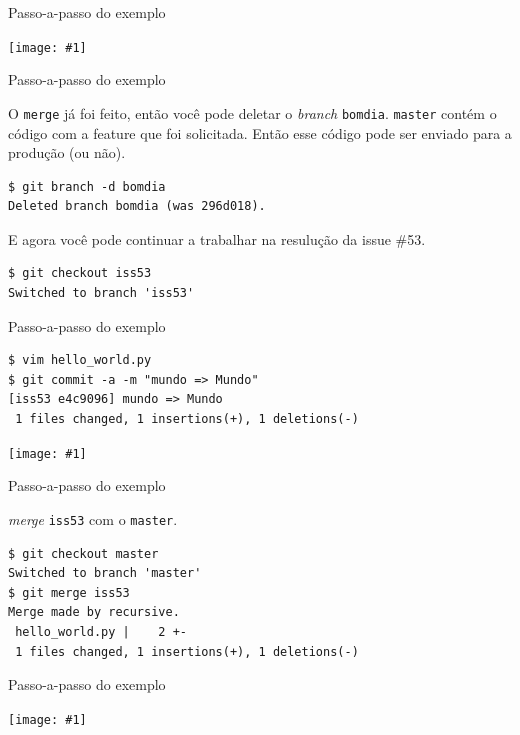 \documentclass[portuguese,brazil]{beamer}
\newcommand\img[1]{
  \begin{center}
    \texttt{[image: \#1]}
  \end{center}
}
\begin{document}
\begin{frame}[fragile]{Passo-a-passo do exemplo}
  \img{images/mergebomdia.png}
\end{frame}

\begin{frame}[fragile]{Passo-a-passo do exemplo}
\begin{center}
O \texttt{merge} já foi feito, então você pode deletar o \textit{branch}
\texttt{bomdia}. \texttt{master} contém o código com a feature que foi
solicitada. Então esse código pode ser enviado para a produção (ou não).
\end{center}
\pause
\begin{verbatim}
$ git branch -d bomdia
Deleted branch bomdia (was 296d018).
\end{verbatim}
\pause
\begin{center}
E agora você pode continuar a trabalhar na resulução da issue \#53.
\end{center}
\pause
\begin{verbatim}
$ git checkout iss53
Switched to branch 'iss53'
\end{verbatim}
\end{frame}

\begin{frame}[fragile]{Passo-a-passo do exemplo}
\pause
\begin{verbatim}
$ vim hello_world.py
$ git commit -a -m "mundo => Mundo"
[iss53 e4c9096] mundo => Mundo
 1 files changed, 1 insertions(+), 1 deletions(-)
\end{verbatim}
\pause
\img{images/secondcommitiss53.png}
\end{frame}

\begin{frame}[fragile]{Passo-a-passo do exemplo}
\begin{center}
\textit{merge} \texttt{iss53} com o \texttt{master}.
\end{center}
\begin{verbatim}
$ git checkout master
Switched to branch 'master'
$ git merge iss53
Merge made by recursive.
 hello_world.py |    2 +-
 1 files changed, 1 insertions(+), 1 deletions(-)
\end{verbatim}
\end{frame}

\begin{frame}{Passo-a-passo do exemplo}
  \img{images/mergeiss53.png}
\end{frame}
\end{document}
